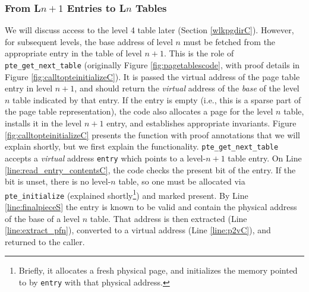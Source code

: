 \subsubsection{From L$n+1$ Entries to L$n$ Tables}
We will discuss access to the level 4 table later (Section \ref{wlkpgdirC}). However, for subsequent levels, the base address of level $n$ must be
fetched from the appropriate entry in the table of level $n+1$.
This is the role of \lstinline|pte_get_next_table| (originally Figure \ref{fig:pagetablescode}, with proof details in Figure \ref{fig:calltopteinitializeC}).
It is passed the virtual address of the page table entry in level $n+1$, and should return the \emph{virtual} 
address of the \emph{base} of the level $n$ table
indicated by that entry.
If the entry is empty (i.e., this is a sparse part of the page table representation),
the code also allocates a page for the level $n$ table, installs it in the level $n+1$ entry, and establishes appropriate invariants.
Figure \ref{fig:calltopteinitializeC} presents the function with proof annotations that we will explain shortly, but we first explain the functionality.
\lstinline|pte_get_next_table| accepts a \emph{virtual} address \lstinline|entry| which points to a level-$n+1$
table entry. On Line \ref{line:read_entry_contentsC}, the code checks the present bit of the entry.
If the bit is unset, there is no level-$n$ table, so one must be allocated via \lstinline|pte_initialize| (explained shortly\footnote{
  Briefly, it allocates a fresh physical page, and initializes the memory pointed to by \lstinline|entry| with that physical address.
}) and marked present.
By Line \ref{line:finalpieceS} the entry is known to be valid and contain the physical address of
the base of a level $n$ table. That address is then extracted (Line \ref{line:extract_pfn}),
converted to a virtual address (Line \ref{line:p2vC}), and returned to the caller.

